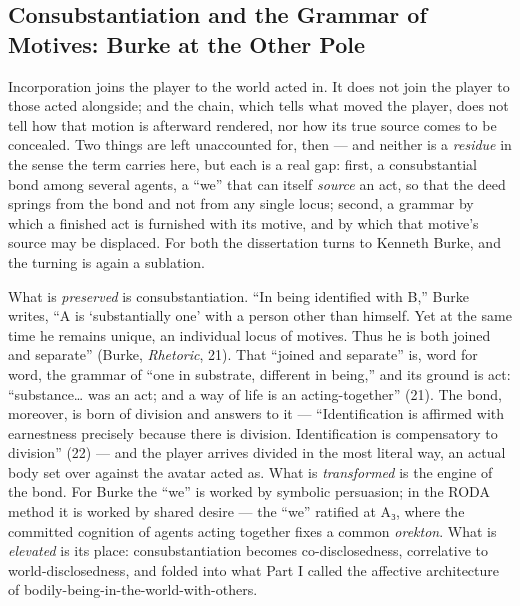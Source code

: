 \documentclass{article}
\begin{document}
\subsection*{Consubstantiation and the Grammar of Motives: Burke at the Other Pole}

Incorporation joins the player to the world acted in. It does not join the player to those acted alongside; and the chain, which tells what moved the player, does not tell how that motion is afterward rendered, nor how its true source comes to be concealed. Two things are left unaccounted for, then — and neither is a \textit{residue} in the sense the term carries here, but each is a real gap: first, a consubstantial bond among several agents, a ``we'' that can itself \textit{source} an act, so that the deed springs from the bond and not from any single locus; second, a grammar by which a finished act is furnished with its motive, and by which that motive's source may be displaced. For both the dissertation turns to Kenneth Burke, and the turning is again a sublation.

What is \textit{preserved} is consubstantiation. ``In being identified with B,'' Burke writes, ``A is `substantially one' with a person other than himself. Yet at the same time he remains unique, an individual locus of motives. Thus he is both joined and separate'' (Burke, \textit{Rhetoric}, 21). That ``joined and separate'' is, word for word, the grammar of ``one in substrate, different in being,'' and its ground is act: ``substance… was an act; and a way of life is an acting-together'' (21). The bond, moreover, is born of division and answers to it — ``Identification is affirmed with earnestness precisely because there is division. Identification is compensatory to division'' (22) — and the player arrives divided in the most literal way, an actual body set over against the avatar acted as. What is \textit{transformed} is the engine of the bond. For Burke the ``we'' is worked by symbolic persuasion; in the RODA method it is worked by shared desire — the ``we'' ratified at A₃, where the committed cognition of agents acting together fixes a common \textit{orekton}. What is \textit{elevated} is its place: consubstantiation becomes co-disclosedness, correlative to world-disclosedness, and folded into what Part I called the affective architecture of bodily-being-in-the-world-with-others.
\end{document}
